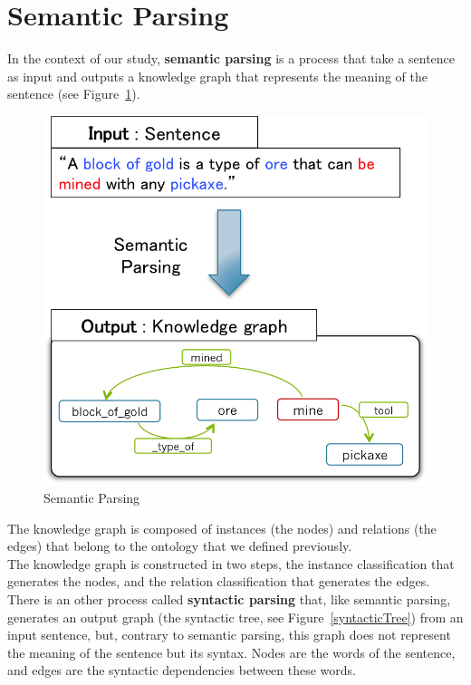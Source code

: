 \documentclass[twocolumn]{article}
\begin{document}

\section{Semantic Parsing}

In the context of our study, \textbf{semantic parsing} is a process that take a sentence as input and outputs a knowledge graph that represents the meaning of the sentence (see Figure~\ref{semanticParsingFigure}).

\begin{figure}[t]
	\centering \includegraphics[width=\linewidth]{Figures/Semantic_Parsing/semanticParsingFigure.png}
	\caption{\label{semanticParsingFigure}Semantic Parsing}
\end{figure}

The knowledge graph is composed of instances (the nodes) and relations (the edges) that belong to the ontology that we defined previously.\\
The knowledge graph is constructed in two steps, the instance classification that generates the nodes, and the relation classification that generates the edges.\\
There is an other process called \textbf{syntactic parsing} that, like semantic parsing, generates an output graph (the syntactic tree, see Figure~\ref{syntacticTree}) from an input sentence, but, contrary to semantic parsing, this graph does not represent the meaning of the sentence but its syntax. Nodes are the words of the sentence, and edges are the syntactic dependencies between these words.
\end{document}
